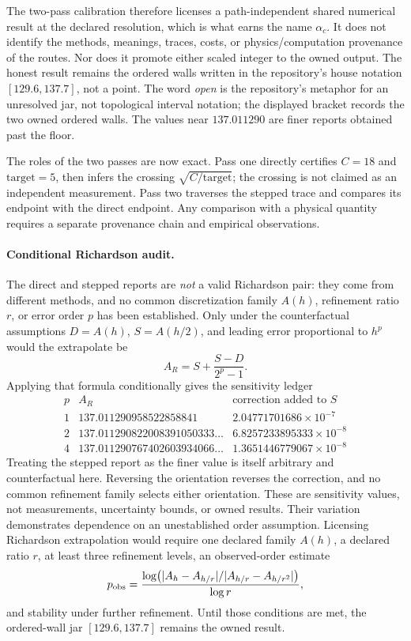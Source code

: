 The two-pass calibration therefore licenses a path-independent shared numerical result at the declared resolution,
which is what earns the name \(\alpha_c\).  It does not identify the methods, meanings, traces, costs, or
physics/computation provenance of the routes.  Nor does it promote either scaled integer to the owned output.  The
honest result remains the ordered walls written in the repository's house notation
\([129.6,137.7]\), not a point.  The word \emph{open} is the repository's metaphor for an unresolved jar, not
topological interval notation; the displayed bracket records the two owned ordered walls.  The values near
\(137.011290\) are finer reports obtained past the floor.

The roles of the two passes are now exact.  Pass one directly certifies \(C=18\) and
\(\text{target}=5\), then infers the crossing \(\sqrt{C/\text{target}}\); the crossing is not claimed as an
independent measurement.  Pass two traverses the stepped trace and compares its endpoint with the direct endpoint.
Any comparison with a physical quantity requires a separate provenance chain and empirical observations.

\paragraph{Conditional Richardson audit.}
The direct and stepped reports are \emph{not} a valid Richardson pair: they come from different methods, and no common
discretization family \(A(h)\), refinement ratio \(r\), or error order \(p\) has been established.  Only under the
counterfactual assumptions \(D=A(h)\), \(S=A(h/2)\), and leading error proportional to \(h^p\) would the extrapolate be
\[
                 A_R=S+\frac{S-D}{2^p-1}.
\]
Applying that formula conditionally gives the sensitivity ledger
\[
\begin{array}{c|c|c}
p&A_R&\text{correction added to }S\\
\hline
1&137.011290958522858841&2.04771701686\times10^{-7}\\
2&137.011290822008391050333\ldots&6.8257233895333\times10^{-8}\\
4&137.011290767402603934066\ldots&1.3651446779067\times10^{-8}
\end{array}
\]
Treating the stepped report as the finer value is itself arbitrary and counterfactual here.  Reversing the orientation
reverses the correction, and no common refinement family selects either orientation.
These are sensitivity values, not measurements, uncertainty bounds, or owned results.  Their variation demonstrates
dependence on an unestablished order assumption.  Licensing Richardson extrapolation would require one declared family
\(A(h)\), a declared ratio \(r\), at least three refinement levels, an observed-order estimate
\[
 p_{\rm obs}=
 \frac{\log\!\left(|A_h-A_{h/r}|/|A_{h/r}-A_{h/r^2}|\right)}{\log r},
\]
and stability under further refinement.  Until those conditions are met, the ordered-wall jar
\([129.6,137.7]\) remains the owned result.

